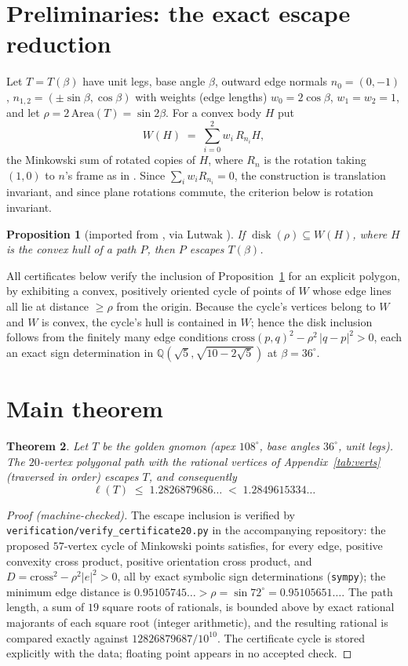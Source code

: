 \documentclass[11pt]{amsart}
\newtheorem{theorem}{Theorem}
\newtheorem{proposition}[theorem]{Proposition}
\theoremstyle{remark}
\begin{document}
\section{Preliminaries: the exact escape reduction}
Let $T=T(\beta)$ have unit legs, base angle $\beta$, outward edge normals
$n_0=(0,-1)$, $n_{1,2}=(\pm\sin\beta,\cos\beta)$ with weights (edge lengths)
$w_0=2\cos\beta$, $w_1=w_2=1$, and let $\rho=2\,\mathrm{Area}(T)=\sin2\beta$.
For a convex body $H$ put
\[
  W(H)\;=\;\sum_{i=0}^{2} w_i\,R_{n_i}H,
\]
the Minkowski sum of rotated copies of $H$, where $R_n$ is the rotation
taking $(1,0)$ to $n$'s frame as in \cite{Tem26}. Since
$\sum_i w_i R_{n_i}=0$, the construction is translation invariant, and since
plane rotations commute, the criterion below is rotation invariant.

\begin{proposition}[imported from \cite{Tem26}, via Lutwak \cite{Lut98}]
\label{prop:reduction}
If $\operatorname{disk}(\rho)\subseteq W(H)$, where $H$ is the convex hull
of a path $P$, then $P$ escapes $T(\beta)$.
\end{proposition}

All certificates below verify the inclusion of
Proposition~\ref{prop:reduction} for an explicit polygon, by exhibiting a
convex, positively oriented cycle of points of $W$ whose edge lines all lie
at distance $\ge\rho$ from the origin. Because the cycle's vertices belong
to $W$ and $W$ is convex, the cycle's hull is contained in $W$; hence the
disk inclusion follows from the finitely many edge conditions
$\mathrm{cross}(p,q)^2-\rho^2\,|q-p|^2>0$, each an exact sign determination
in $\mathbb{Q}(\sqrt5,\sqrt{10-2\sqrt5})$ at $\beta=36^\circ$.

\section{Main theorem}
\begin{theorem}\label{thm:main}
Let $T$ be the golden gnomon (apex $108^\circ$, base angles $36^\circ$,
unit legs). The $20$-vertex polygonal path with the rational vertices of
Appendix~\ref{tab:verts} (traversed in order) escapes $T$, and consequently
\[
  \ell(T)\;\le\;1.2826879686\ldots\;<\;1.2849615334\ldots
\]
\end{theorem}

\begin{proof}[Proof (machine-checked)]
The escape inclusion is verified by
\texttt{verification/verify\_certificate20.py} in the accompanying
repository: the proposed $57$-vertex cycle of Minkowski points satisfies,
for every edge, positive convexity cross product, positive orientation
cross product, and $D=\mathrm{cross}^2-\rho^2|e|^2>0$, all by exact
symbolic sign determinations (\texttt{sympy}); the minimum edge distance is
$0.95105745\ldots>\rho=\sin72^\circ=0.95105651\ldots$. The path length, a
sum of $19$ square roots of rationals, is bounded above by exact rational
majorants of each square root (integer arithmetic), and the resulting
rational is compared exactly against $12826879687/10^{10}$. The certificate
cycle is stored explicitly with the data; floating point appears in no
accepted check.
\end{proof}
\end{document}
